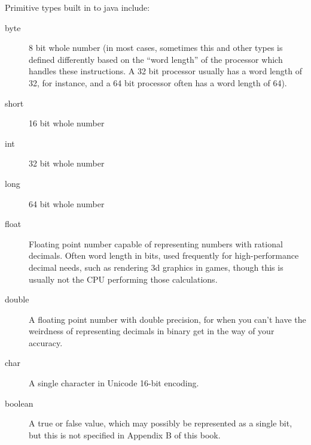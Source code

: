 Primitive types built in to java include:
\begin{description}
	\item [byte] 8 bit whole number (in most cases, sometimes this
		and other types is defined differently based on the
		``word length'' of the processor which handles these
		instructions. A 32 bit processor usually has a word
		length of 32, for instance, and a 64 bit processor often
		has a word length of 64).
	\item [short] 16 bit whole number
	\item [int] 32 bit whole number
	\item [long] 64 bit whole number
	\item [float] Floating point number capable of representing
		numbers with rational decimals. Often word length in
		bits, used frequently for high-performance decimal
		needs, such as rendering 3d graphics in games, though
		this is usually not the CPU performing those
		calculations.
	\item [double] A floating point number with double precision,
		for when you can't have the weirdness of representing
		decimals in binary get in the way of your accuracy.
	\item [char] A single character in Unicode 16-bit encoding.
	\item [boolean] A true or false value, which may possibly be
		represented as a single bit, but this is not specified
		in Appendix B of this book.
\end{description}
